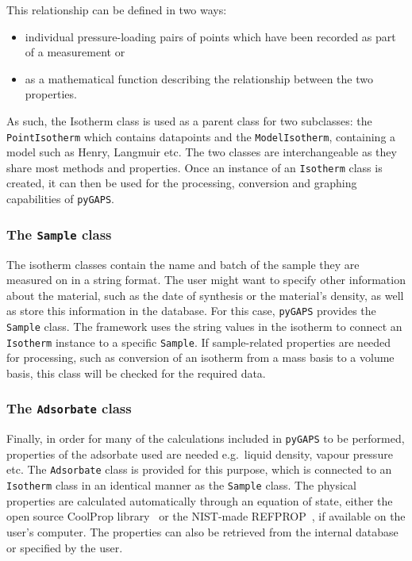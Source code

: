 This relationship can be defined in two ways:

\begin{itemize}
    \item individual pressure-loading pairs of points which have 
    been recorded as part of a measurement or
    \item as a mathematical function describing the relationship 
    between the two properties. 
\end{itemize}

As such, the Isotherm class is used as a parent class for two subclasses: 
the \texttt{PointIsotherm} which contains datapoints and the
\texttt{ModelIsotherm}, containing a model such as Henry, Langmuir etc. 
The two classes are interchangeable 
as they share most methods and properties. Once an instance of 
an \texttt{Isotherm} class is created, it can then be used for the 
processing, conversion and graphing capabilities of \texttt{pyGAPS}.

\subsubsection{The \texttt{Sample} class}

The isotherm classes contain the name and batch of the sample 
they are measured on in a string format. The user might want to 
specify other information about the material,
such as the date of synthesis or the material's density,
as well as store this information in the database.
For this case, \texttt{pyGAPS} provides the \texttt{Sample} class.
The framework uses the string values
in the isotherm to connect an \texttt{Isotherm} instance to a 
specific \texttt{Sample}. If sample-related properties are 
needed for processing, such as conversion of an isotherm
from a mass basis to a volume basis, this class will be 
checked for the required data.

\subsubsection{The \texttt{Adsorbate} class}

Finally, in order for many of the calculations included in 
\texttt{pyGAPS} to be performed, properties of the adsorbate 
used are needed e.g.\ liquid density, vapour pressure etc.
The \texttt{Adsorbate} class is provided for this purpose,
which is connected to an \texttt{Isotherm} class in an identical manner 
as the \texttt{Sample} class. The physical properties are calculated 
automatically through an equation of state,
either the open source CoolProp library~\cite{bellPurePseudopureFluid2014} 
or the NIST-made REFPROP~\cite{lemmonNISTReferenceFluid1989}, if available
on the user's computer. The properties can also be retrieved 
from the internal database or specified by the user.


